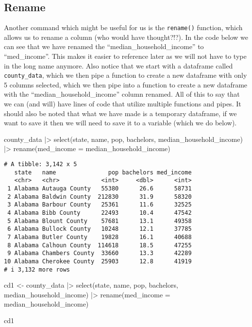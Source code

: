 \documentclass[
  letterpaper,
  DIV=11,
  numbers=noendperiod]{scrreprt}
\newenvironment{Shaded}{\begin{snugshade}}{\end{snugshade}}
\newcommand{\AttributeTok}[1]{\textcolor[rgb]{0.40,0.45,0.13}{#1}}
\newcommand{\FunctionTok}[1]{\textcolor[rgb]{0.28,0.35,0.67}{#1}}
\newcommand{\NormalTok}[1]{\textcolor[rgb]{0.00,0.23,0.31}{#1}}
\newcommand{\OtherTok}[1]{\textcolor[rgb]{0.00,0.23,0.31}{#1}}
\newcommand{\SpecialCharTok}[1]{\textcolor[rgb]{0.37,0.37,0.37}{#1}}
\begin{document}
\subsection{Rename}\label{rename}

Another command which might be useful for us is the \texttt{rename()}
function, which allows us to rename a column (who would have
thought?!?). In the code below we can see that we have renamed the
``median\_household\_income'' to ``med\_income''. This makes it easier
to reference later as we will not have to type in the long name anymore.
Also notice that we start with a dataframe called \texttt{county\_data},
which we then pipe a function to create a new dataframe with only 5
columns selected, which we then pipe into a function to create a new
dataframe with the ``median\_household\_income'' column renamed. All of
this to say that we can (and will) have lines of code that utilize
multiple functions and pipes. It should also be noted that what we have
made is a temporary dataframe, if we want to save it then we will need
to save it to a variable (which we do below).

\begin{Shaded}
\begin{Highlighting}[]
\NormalTok{county\_data }\SpecialCharTok{|\textgreater{}} \FunctionTok{select}\NormalTok{(state, name, pop, bachelors, median\_household\_income) }\SpecialCharTok{|\textgreater{}} 
    \FunctionTok{rename}\NormalTok{(}\AttributeTok{med\_income =}\NormalTok{ median\_household\_income)}
\end{Highlighting}
\end{Shaded}

\begin{verbatim}
# A tibble: 3,142 x 5
   state   name               pop bachelors med_income
   <chr>   <chr>            <int>     <dbl>      <int>
 1 Alabama Autauga County   55380      26.6      58731
 2 Alabama Baldwin County  212830      31.9      58320
 3 Alabama Barbour County   25361      11.6      32525
 4 Alabama Bibb County      22493      10.4      47542
 5 Alabama Blount County    57681      13.1      49358
 6 Alabama Bullock County   10248      12.1      37785
 7 Alabama Butler County    19828      16.1      40688
 8 Alabama Calhoun County  114618      18.5      47255
 9 Alabama Chambers County  33660      13.3      42289
10 Alabama Cherokee County  25903      12.8      41919
# i 3,132 more rows
\end{verbatim}

\begin{Shaded}
\begin{Highlighting}[]
\NormalTok{cd1 }\OtherTok{\textless{}{-}}\NormalTok{ county\_data }\SpecialCharTok{|\textgreater{}} \FunctionTok{select}\NormalTok{(state, name, pop, bachelors, median\_household\_income) }\SpecialCharTok{|\textgreater{}} 
           \FunctionTok{rename}\NormalTok{(}\AttributeTok{med\_income =}\NormalTok{ median\_household\_income)}

\NormalTok{cd1}
\end{Highlighting}
\end{Shaded}
\end{document}
